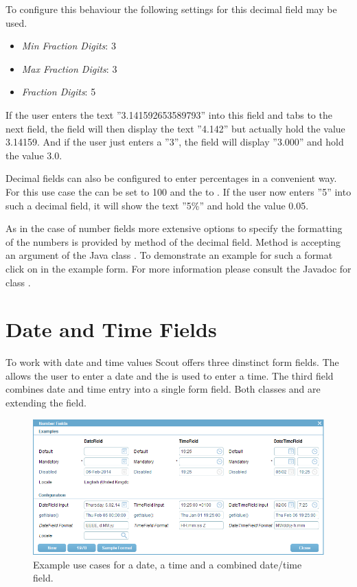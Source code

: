 \documentclass[a4paper,10pt,twoside]{book}
\begin{document}
To configure this behaviour the following settings for this decimal field may be used.

\begin{itemize}
  \item \textit{Min Fraction Digits}: 3
  \item \textit{Max Fraction Digits}: 3
  \item \textit{Fraction Digits}: 5
\end{itemize}

If the user enters the text ''3.141592653589793'' into this field and tabs to the next field, the field will then display the text ''4.142'' but actually hold the value 3.14159. 
And if the user just enters a ''3'', the field will display ''3.000'' and hold the value 3.0.

Decimal fields can also be configured to enter percentages in a convenient way. 
For this use case the  can be set to 100 and the  to . 
If the user now enters ''5'' into such a decimal field, it will show the text ''5\%'' and hold the value 0.05.

As in the case of number fields more extensive options to specify the formatting of the numbers is provided by  method of the decimal field. 
Method  is accepting an argument of the Java class . 
To demonstrate an example for such a format click on  in the example form. 
For more information please consult the Javadoc for class .

\section{Date and Time Fields}

To work with date and time values Scout offers three dinstinct form fields. 
The  allows the user to enter a date and the  is used to enter a time. 
The third field  combines date and time entry into a single form field. 
Both classes  and  are extending the  field.

\begin{figure}
\includegraphics[width=15cm]{datetimefield.png}
\caption{Example use cases for a date, a time and a combined date/time field.
}
\end{figure}
\end{document}
